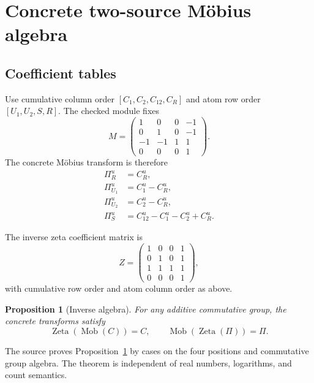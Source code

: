 \documentclass[11pt]{article}
\newtheorem{proposition}[theorem]{Proposition}
\theoremstyle{definition}
\newcommand{\Mob}{\operatorname{Mob}}
\newcommand{\Zeta}{\operatorname{Zeta}}
\begin{document}
\section{Concrete two-source M\"obius algebra}

\subsection{Coefficient tables}

Use cumulative column order \([C_1,C_2,C_{12},C_R]\) and atom row order
\([U_1,U_2,S,R]\).  The checked module fixes
\begin{equation}\label{eq:mobius-matrix}
M=
\begin{pmatrix}
 1& 0&0&-1\\
 0& 1&0&-1\\
-1&-1&1& 1\\
 0& 0&0& 1
\end{pmatrix}.
\end{equation}
The concrete M\"obius transform is therefore
\begin{align}
\Pi^u_R&=C^u_R,\label{eq:atom-r}\\
\Pi^u_{U_1}&=C^u_1-C^u_R,\label{eq:atom-u1}\\
\Pi^u_{U_2}&=C^u_2-C^u_R,\label{eq:atom-u2}\\
\Pi^u_S&=C^u_{12}-C^u_1-C^u_2+C^u_R.\label{eq:atom-s}
\end{align}

The inverse zeta coefficient matrix is
\begin{equation}\label{eq:zeta-matrix}
Z=
\begin{pmatrix}
1&0&0&1\\
0&1&0&1\\
1&1&1&1\\
0&0&0&1
\end{pmatrix},
\end{equation}
with cumulative row order and atom column order as above.

\begin{proposition}[Inverse algebra]\label{prop:inverse}
For any additive commutative group, the concrete transforms satisfy
\[
\Zeta(\Mob(C))=C,
\qquad
\Mob(\Zeta(\Pi))=\Pi.
\]
\end{proposition}

The source proves Proposition~\ref{prop:inverse} by cases on the four positions and commutative
group algebra.  The theorem is independent of real numbers, logarithms, and count semantics.
\end{document}
